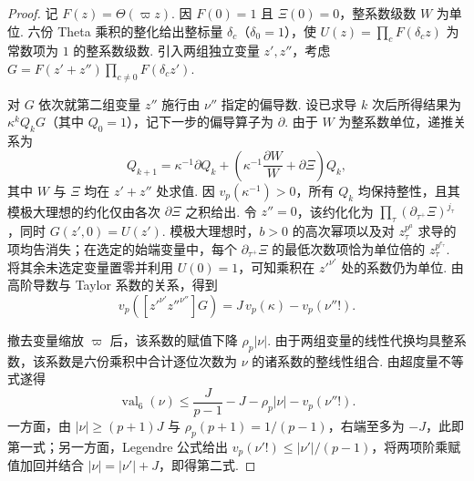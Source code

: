 \begin{proof}
记 $F(z)=\Theta(\varpi z)$. 因 $F(0)=1$ 且 $\Xi(0)=0$，整系数级数 $W$ 为单位. 六份 Theta 乘积的整化给出整标量 $\delta_c$（$\delta_0=1$），使 $U(z)=\prod_c F(\delta_c z)$ 为常数项为 $1$ 的整系数级数. 引入两组独立变量 $z',z''$，考虑 $G=F(z'+z'')\prod_{c\ne0}F(\delta_c z')$.

对 $G$ 依次就第二组变量 $z''$ 施行由 $\nu''$ 指定的偏导数. 设已求导 $k$ 次后所得结果为 $\kappa^kQ_kG$（其中 $Q_0=1$），记下一步的偏导算子为 $\partial$. 由于 $W$ 为整系数单位，递推关系为
\[
 Q_{k+1}=\kappa^{-1}\partial Q_k+
    \left(\kappa^{-1}\frac{\partial W}{W}+\partial\Xi\right)Q_k ,
\]
其中 $W$ 与 $\Xi$ 均在 $z'+z''$ 处求值. 因 $v_p(\kappa^{-1})>0$，所有 $Q_k$ 均保持整性，且其模极大理想的约化仅由各次 $\partial\Xi$ 之积给出. 令 $z''=0$，该约化化为 $\prod_\tau(\partial_{\tau^+}\Xi)^{j_\tau}$，同时 $G(z',0)=U(z')$. 模极大理想时，$b>0$ 的高次幂项以及对 $z_\tau^{p^a}$ 求导的项均告消失；在选定的始端变量中，每个 $\partial_{\tau^+}\Xi$ 的最低次数项恰为单位倍的 $z_\tau^{p^{e_\tau}}$. 将其余未选定变量置零并利用 $U(0)=1$，可知乘积在 $z'^{\nu'}$ 处的系数仍为单位. 由高阶导数与 Taylor 系数的关系，得到
\[
 v_p([z'^{\nu'}z''^{\nu''}]G)=J\,v_p(\kappa)-v_p(\nu''!).
\]

撤去变量缩放 $\varpi$ 后，该系数的赋值下降 $\rho_p|\nu|$. 由于两组变量的线性代换均具整系数，该系数是六份乘积中合计逐位次数为 $\nu$ 的诸系数的整线性组合. 由超度量不等式遂得
\[
 \operatorname{val}_6(\nu)\le \frac{J}{p-1}-J-\rho_p|\nu|-v_p(\nu''!).
\]
一方面，由 $|\nu|\ge(p+1)J$ 与 $\rho_p(p+1)=1/(p-1)$，右端至多为 $-J$，此即第一式；另一方面，Legendre 公式给出 $v_p(\nu'!)\le|\nu'|/(p-1)$，将两项阶乘赋值加回并结合 $|\nu|=|\nu'|+J$，即得第二式.
\end{proof}

